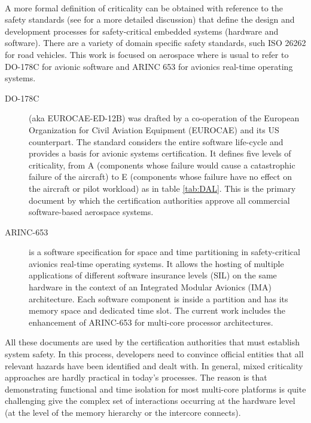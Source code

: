 \paragraph{}A more formal definition of criticality can be obtained with reference to the safety standards (see \cite{MCSmisconception} for a more detailed discussion) that define the design and development processes for safety-critical embedded systems (hardware and software). There are a variety of domain specific safety standards, such ISO 26262 for road vehicles. This work is focused on aerospace where is usual to refer to DO-178C \cite{do178c} for avionic software and ARINC 653 \cite{arinc653} for avionics real-time operating systems. %
\begin{description}
	\item[DO-178C] (aka EUROCAE-ED-12B) was drafted by a co-operation of the European Organization for Civil Aviation Equipment (EUROCAE) and its US counterpart. The standard considers the entire software life-cycle and provides a basis for avionic systems certification. It defines five levels of criticality, from A (components whose failure would cause a catastrophic failure of the aircraft) to E (components whose failure have no effect on the aircraft or pilot workload) as in table \ref{tab:DAL}. This is the primary document by which the certification authorities approve all commercial software-based aerospace systems.
	\item[ARINC-653] is a software specification for space and time partitioning in safety-critical avionics real-time operating systems. It allows the hosting of multiple applications of different software insurance levels (SIL) on the same hardware in the context of an Integrated Modular Avionics (IMA) architecture. Each software component is inside a partition and has its memory space and dedicated time slot. The current work includes the enhancement of ARINC-653 for multi-core processor architectures.
\end{description}
All these documents are used by the certification authorities that must establish system safety. In this process, developers need to convince official entities that all relevant hazards have been identified and dealt with. In general, mixed criticality approaches are hardly practical in today's processes. The reason is that demonstrating functional and time isolation for most  multi-core platforms is quite challenging give the complex set of interactions occurring at the hardware level (at the level of the memory hierarchy or the intercore connects).

